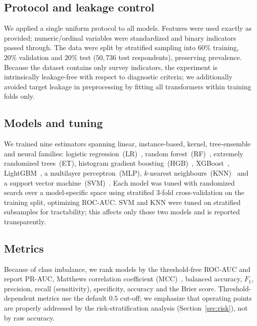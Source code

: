 \documentclass[conference]{IEEEtran}
\begin{document}
\subsection{Protocol and leakage control}
We applied a single uniform protocol to all models. Features were used exactly as
provided; numeric/ordinal variables were standardized and binary indicators passed
through. The data were split by stratified sampling into $60\%$ training, $20\%$
validation and $20\%$ test ($50{,}736$ test respondents), preserving prevalence. Because
the dataset contains only survey indicators, the experiment is intrinsically
leakage-free with respect to diagnostic criteria; we additionally avoided target
leakage in preprocessing by fitting all transformers within training folds only.

\subsection{Models and tuning}
We trained nine estimators spanning linear, instance-based, kernel, tree-ensemble and
neural families: logistic regression~(LR)~\cite{pedregosa2011scikit}, random
forest~(RF)~\cite{breiman2001random}, extremely randomized trees~(ET), histogram
gradient boosting~(HGB)~\cite{friedman2001greedy}, XGBoost~\cite{chen2016xgboost},
LightGBM~\cite{ke2017lightgbm}, a multilayer perceptron~(MLP),
$k$-nearest neighbours~(KNN)~\cite{cover1967knn} and a support vector
machine~(SVM)~\cite{cortes1995svm}. Each model was tuned with randomized search over a
model-specific space using stratified $3$-fold cross-validation on the training split,
optimizing ROC-AUC. SVM and KNN were tuned on stratified subsamples for tractability;
this affects only those two models and is reported transparently.

\subsection{Metrics}
Because of class imbalance, we rank models by the threshold-free ROC-AUC and report
PR-AUC, Matthews correlation coefficient (MCC)~\cite{chicco2020mcc}, balanced accuracy,
$F_1$, precision, recall (sensitivity), specificity, accuracy and the Brier score.
Threshold-dependent metrics use the default $0.5$ cut-off; we emphasize that operating
points are properly addressed by the risk-stratification analysis
(Section~\ref{sec:risk}), not by raw accuracy.
\end{document}
